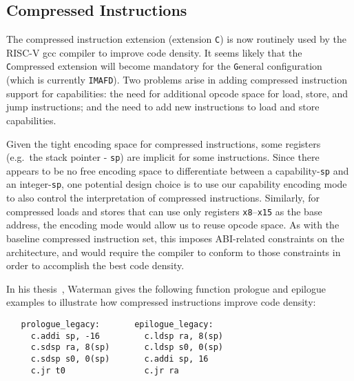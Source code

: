 \subsection{Compressed Instructions}
\label{subsection:compressed-instructions}


The compressed instruction extension (extension \texttt{C}) is now
routinely used by the RISC-V gcc compiler to improve code density.  It seems
likely that the \texttt{C}ompressed extension will become mandatory for
the \texttt{G}eneral configuration (which is currently
\texttt{IMAFD}).
Two problems arise in adding compressed instruction support for capabilities:
the need for additional opcode space for load, store, and jump instructions;
and the need to add new instructions to load and store capabilities.

Given the tight encoding space for compressed instructions, some
registers (e.g.~the stack pointer - \texttt{sp}) are implicit for some
instructions.  Since there appears to be no free encoding space to
differentiate between a capability-\texttt{sp} and an
integer-\texttt{sp}, one potential design choice is to use our capability
encoding mode to also control the interpretation of compressed instructions.
Similarly, for compressed loads and
stores that can use only registers \texttt{x8}--\texttt{x15} as the
base address, the encoding mode would allow us to reuse opcode space.
As with the baseline compressed instruction set, this imposes ABI-related
constraints on the architecture, and would require the compiler to conform to
those constraints in order to accomplish the best code density.

In his thesis~\cite{WatermanThesis2016}, Waterman gives the following
function prologue and epilogue examples to illustrate how compressed
instructions improve code density:

\begin{small}
\begin{verbatim}
   prologue_legacy:       epilogue_legacy:
     c.addi sp, -16         c.ldsp ra, 8(sp)
     c.sdsp ra, 8(sp)       c.ldsp s0, 0(sp)
     c.sdsp s0, 0(sp)       c.addi sp, 16
     c.jr t0                c.jr ra
\end{verbatim}
\end{small}

